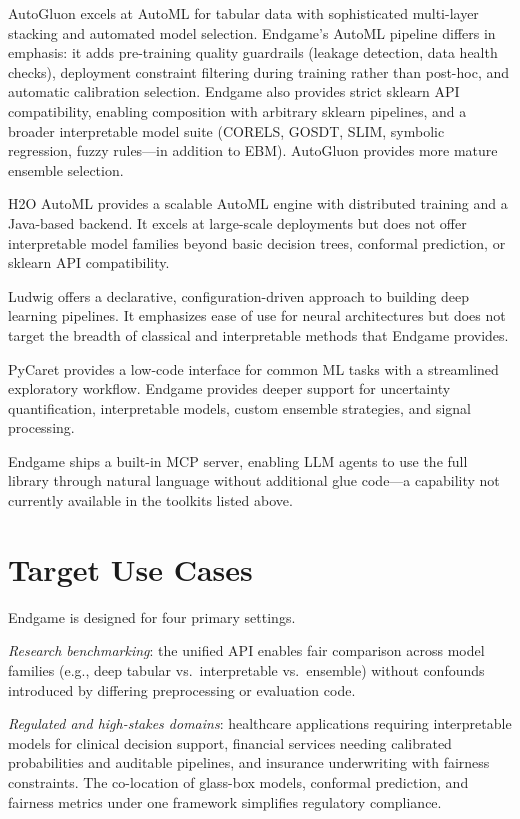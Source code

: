 \documentclass[11pt]{article}
\begin{document}
AutoGluon \citep{erickson2020autogluon} excels at AutoML for tabular data
with sophisticated multi-layer stacking and automated model selection.
Endgame's AutoML pipeline differs in emphasis: it adds pre-training quality
guardrails (leakage detection, data health checks), deployment constraint
filtering during training rather than post-hoc, and automatic calibration
selection. Endgame also provides strict sklearn API compatibility, enabling
composition with arbitrary sklearn pipelines, and a broader interpretable
model suite (CORELS, GOSDT, SLIM, symbolic regression, fuzzy rules---in
addition to EBM). AutoGluon provides more mature ensemble selection.

H2O AutoML \citep{ledell2020h2o} provides a scalable AutoML engine with
distributed training and a Java-based backend. It excels at large-scale
deployments but does not offer interpretable model families beyond basic
decision trees, conformal prediction, or sklearn API compatibility.

Ludwig \citep{molino2019ludwig} offers a declarative, configuration-driven
approach to building deep learning pipelines. It emphasizes ease of use for
neural architectures but does not target the breadth of classical and
interpretable methods that Endgame provides.

PyCaret provides a low-code interface for common ML tasks with a streamlined
exploratory workflow. Endgame provides deeper support for uncertainty
quantification, interpretable models, custom ensemble strategies, and
signal processing.

Endgame ships a built-in MCP server, enabling LLM agents to use the full
library through natural language without additional glue code---a
capability not currently available in the toolkits listed above.

\section{Target Use Cases}
\label{sec:usecases}

Endgame is designed for four primary settings.

\emph{Research benchmarking}: the unified API enables fair comparison across
model families (e.g., deep tabular vs.\ interpretable vs.\ ensemble) without
confounds introduced by differing preprocessing or evaluation code.

\emph{Regulated and high-stakes domains}: healthcare applications requiring
interpretable models for clinical decision support, financial services
needing calibrated probabilities and auditable pipelines, and insurance
underwriting with fairness constraints. The co-location of glass-box models,
conformal prediction, and fairness metrics under one framework simplifies
regulatory compliance.
\end{document}
